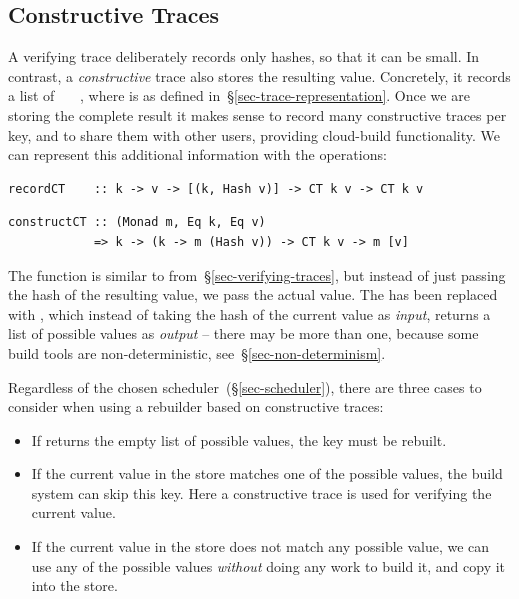 \subsection{Constructive Traces}\label{sec-constructive-traces}

A verifying trace deliberately records only hashes, so that it can be small. In
contrast, a \emph{constructive} trace also stores the resulting value.
Concretely, it records a list of ~~~, where
 is as defined in~\S\ref{sec-trace-representation}. Once we are
storing the complete result it makes sense to record many constructive traces
per key, and to share them with other users, providing cloud-build
functionality. We can represent this additional information with the operations:

\vspace{1mm}
\begin{verbatim}
recordCT    :: k -> v -> [(k, Hash v)] -> CT k v -> CT k v
\end{verbatim}
\vspace{-2mm}
\begin{verbatim}
constructCT :: (Monad m, Eq k, Eq v)
            => k -> (k -> m (Hash v)) -> CT k v -> m [v]
\end{verbatim}
\vspace{1mm}

\noindent
The function  is similar to 
from~\S\ref{sec-verifying-traces}, but instead of just passing
the hash of the resulting value, we pass the actual value. The 
has been replaced with , which instead of taking the hash of the
current value as \emph{input}, returns a list of possible values as
\emph{output} -- there may be more than one, because some build tools are
non-deterministic, see~\S\ref{sec-non-determinism}.

Regardless of the chosen scheduler~(\S\ref{sec-scheduler}), there are three
cases to consider when using a rebuilder based on constructive traces:

\begin{itemize}
  \item If  returns the empty list of possible values, the key
        must be rebuilt.
  \item If the current value in the store matches one of the possible values,
        the build system can skip this key. Here a constructive trace is used
        for verifying the current value.
  \item If the current value in the store does not match any possible value, we
        can use any of the possible values \emph{without} doing any work to
        build it, and copy it into the store.
\end{itemize}

